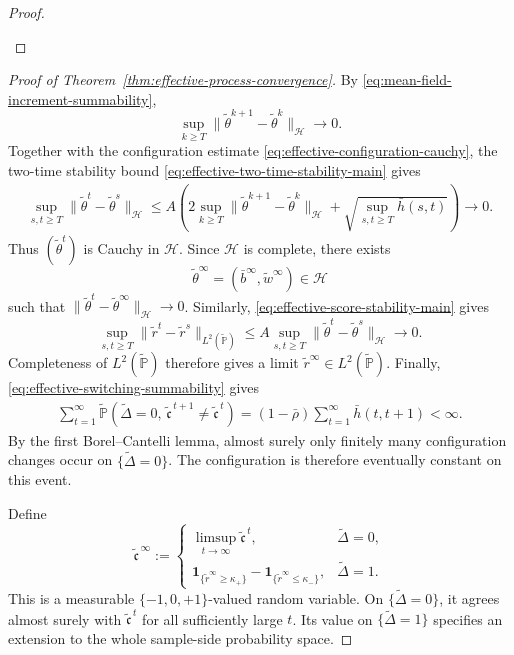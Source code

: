 \begin{proof}
\begin{itemize}[wide]
\end{itemize}

\end{proof}

\begin{proof}[Proof of Theorem~\ref{thm:effective-process-convergence}]
By \eqref{eq:mean-field-increment-summability},
\[
    \sup_{k\geq T}
        \|\tilde\theta^{k+1}-\tilde\theta^k\|_{\mathcal H}
    \longrightarrow0.
\]
Together with the configuration estimate
\eqref{eq:effective-configuration-cauchy},
the two-time stability bound
\eqref{eq:effective-two-time-stability-main} gives
\[
\begin{aligned}
    \sup_{s,t\geq T}
        \|\tilde\theta^t-\tilde\theta^s\|_{\mathcal H}
    \leq
    A\left(
        2\sup_{k\geq T}
            \|\tilde\theta^{k+1}-\tilde\theta^k\|_{\mathcal H}
        +\sqrt{\sup_{s,t\geq T}\bar h(s,t)}
    \right)
    \longrightarrow0.
\end{aligned}
\]
Thus $(\tilde\theta^t)$ is Cauchy in $\mathcal H$.
Since $\mathcal H$ is complete, there exists
\[
    \tilde\theta^\infty
    =
    (\bar b^\infty,\tilde w^\infty)\in\mathcal H
\]
such that
$\|\tilde\theta^t-\tilde\theta^\infty\|_{\mathcal H}\to0$.
Similarly, \eqref{eq:effective-score-stability-main} gives
\[
    \sup_{s,t\geq T}
        \|\tilde r^t-\tilde r^s\|_
            {L^2(\tilde{\mathbb P})}
    \leq
    A\sup_{s,t\geq T}
        \|\tilde\theta^t-\tilde\theta^s\|_{\mathcal H}
    \longrightarrow0.
\]
Completeness of $L^2(\tilde{\mathbb P})$ therefore
gives a limit
$\tilde r^\infty\in L^2(\tilde{\mathbb P})$.
Finally, \eqref{eq:effective-switching-summability} gives
\[
\begin{aligned}
    \sum_{t=1}^{\infty}
    \tilde{\mathbb P}\left(
        \tilde\Delta=0,\,
        \tilde{\mathfrak c}^{\,t+1}
        \neq\tilde{\mathfrak c}^{\,t}
    \right)
    =
    (1-\bar\rho)\sum_{t=1}^{\infty}\bar h(t,t+1)
    <\infty.
\end{aligned}
\]
By the first Borel--Cantelli lemma, almost surely only finitely
many configuration changes occur on $\{\tilde\Delta=0\}$.
The configuration is therefore eventually constant on this event.

Define
\[
    \tilde{\mathfrak c}^{\,\infty}
    :=
    \begin{cases}
        \displaystyle
        \limsup_{t\to\infty}\tilde{\mathfrak c}^{\,t},
        &\tilde\Delta=0,\\[6pt]
        \mathbf1_{\{\tilde r^\infty\geq\kappa_+\}}
        -
        \mathbf1_{\{\tilde r^\infty\leq\kappa_-\}},
        &\tilde\Delta=1.
    \end{cases}
\]
This is a measurable $\{-1,0,+1\}$-valued random variable.
On $\{\tilde\Delta=0\}$, it agrees almost surely with
$\tilde{\mathfrak c}^{\,t}$ for all sufficiently large $t$.
Its value on $\{\tilde\Delta=1\}$ specifies an extension
to the whole sample-side probability space.
\end{proof}

